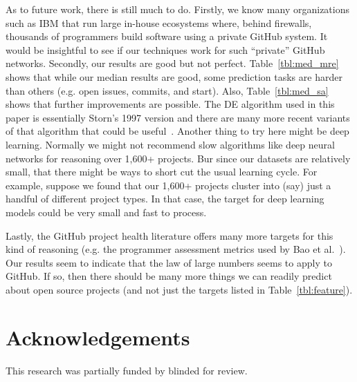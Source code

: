 \documentclass[sigconf,review,anonymous]{acmart}
\newcommand{\tbl}[1]{Table~\ref{tbl:#1}}
\begin{document}
As to future work, there is still much to do. Firstly, we know many organizations such as IBM that run large in-house ecosystems where, behind firewalls, thousands of programmers build software using  a private GitHub system. It would be insightful to see if our techniques work for such ``private'' GitHub networks.
Secondly, our results are good but not perfect. 
Table~\ref{tbl:med_mre} shows that while our median results are good, some prediction tasks are harder than others
(e.g. open issues, commits, and start).
Also, Table~\ref{tbl:med_sa} shows that further improvements are possible. The DE algorithm used in this paper is essentially Storn's 1997 version and there are many more recent variants of that algorithm that could be useful~\cite{wu2018ensemble,das2016recent}. Another thing to try here might be deep learning. Normally we might not recommend slow algorithms like deep neural networks for reasoning over 1,600+ projects. Bur since our datasets are relatively small, that there might be ways to short cut the usual learning cycle. For example, suppose we found that our 1,600+ projects cluster into (say) just a handful of different project types. In that case, the target for deep learning models could be very small and fast to process.


Lastly, the GitHub project health literature offers many more targets for this kind of reasoning (e.g. the programmer assessment metrics
used by Bao et al.~\cite{bao2019large}).  Our results seem to indicate that   the law of large numbers seems to apply to GitHub. If so, then there should be many more things we can readily predict about open source  projects (and not just the targets listed in \tbl{feature}).

\vspace{3mm}

\section*{Acknowledgements}
This research was partially funded by blinded for review.


\newpage \balance


\end{document}
